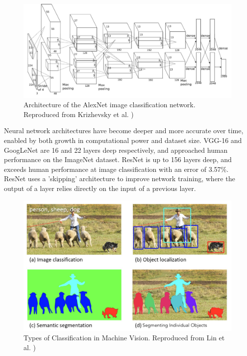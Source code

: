 \documentclass[12pt]{article}
\begin{document}
\begin{figure}[H]
    \centering
    \includegraphics[width=0.8\linewidth]{images/alexnet_architecture.png}
    \caption{Architecture of the AlexNet image classification network. Reproduced from Krizhevsky et al. \cite{krizhevskyImageNetClassificationDeep2012})}
    \label{fig:alexnet_architecture}
\end{figure}

Neural network architectures have become deeper and more accurate over time, enabled by both
growth in computational power and dataset size. VGG-16 \cite{simonyanVeryDeepConvolutional2014}
and GoogLeNet \cite{szegedyGoingDeeperConvolutions2014}
are 16 and 22 layers deep respectively, and approached
human performance on the ImageNet dataset. ResNet \cite{heDeepResidualLearning2016} is up to 156 layers deep,
and exceeds human performance at image classification with an error of 3.57\%.
ResNet uses a 'skipping' architecture to improve network training, where the output of a layer relies directly on
the input of a previous layer.

\begin{figure}[H]
    \centering
    \includegraphics[width=0.6\linewidth]{images/classification_types.png}
    \caption{Types of Classification in Machine Vision. Reproduced from Lin et al. \cite{linMicrosoftCOCOCommon2014})}
    \label{fig:classification_types}
\end{figure}
\end{document}
